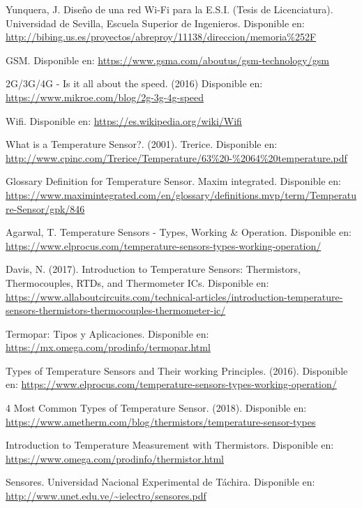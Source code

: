 \begin{thebibliography}{0}
	 Yunquera, J. Diseño de una red Wi-Fi para la E.S.I. (Tesis de Licenciatura). Universidad de Sevilla, Escuela Superior de Ingenieros. Disponible en: \url{http://bibing.us.es/proyectos/abreproy/11138/direccion/memoria%252F}
	
	 GSM. Disponible en: \url{https://www.gsma.com/aboutus/gsm-technology/gsm}
	
	 2G/3G/4G - Is it all about the speed. (2016) Disponible en: \url{https://www.mikroe.com/blog/2g-3g-4g-speed}
	
	 Wifi. Disponible en: \url{https://es.wikipedia.org/wiki/Wifi}
	
	
	 What is a Temperature Sensor?. (2001). Trerice. Disponible en: \url{http://www.cpinc.com/Trerice/Temperature/63%20-%2064%20temperature.pdf}
	
	 Glossary Definition for Temperature Sensor. Maxim integrated. Disponible en: \url{https://www.maximintegrated.com/en/glossary/definitions.mvp/term/Temperature-Sensor/gpk/846}
	
	 Agarwal, T.  Temperature Sensors - Types, Working \& Operation. Disponible en: \url{https://www.elprocus.com/temperature-sensors-types-working-operation/}
	
	 Davis, N. (2017). Introduction to Temperature Sensors: Thermistors, Thermocouples, RTDs, and Thermometer ICs. Disponible en: \url{https://www.allaboutcircuits.com/technical-articles/introduction-temperature-sensors-thermistors-thermocouples-thermometer-ic/}
	
	 Termopar: Tipos y Aplicaciones. Disponible en: \url{ https://mx.omega.com/prodinfo/termopar.html}
	
	 Types of Temperature Sensors and Their working Principles. (2016). Disponible en: \url{https://www.elprocus.com/temperature-sensors-types-working-operation/}
	
	 4 Most Common Types of Temperature Sensor. (2018). Disponible en: \url{https://www.ametherm.com/blog/thermistors/temperature-sensor-types}
	
	 Introduction to Temperature Measurement with Thermistors. Disponible en: \url{https://www.omega.com/prodinfo/thermistor.html}
	
	 Sensores. Universidad Nacional Experimental de Táchira. Disponible en: \url{http://www.unet.edu.ve/~ielectro/sensores.pdf}
	

\end{thebibliography}
